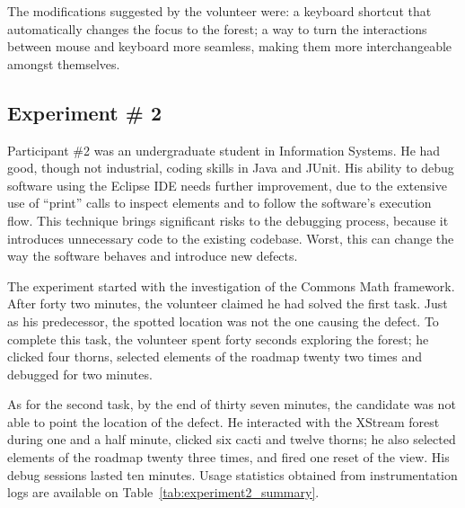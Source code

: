 The modifications suggested by the volunteer were: a keyboard shortcut that
automatically changes the focus to the forest; a way to turn the interactions
between mouse and keyboard more seamless, making them more interchangeable
amongst themselves.

\subsection{Experiment \# 2}

Participant \#2 was an undergraduate student in Information Systems. He had
good, though not industrial, coding skills in Java and JUnit. His ability
to debug software using the Eclipse IDE needs further improvement, due to the
extensive use of ``print'' calls to inspect elements and to follow the
software's execution flow. This technique brings significant risks to the
debugging process, because it introduces unnecessary code to the existing
codebase. Worst, this can change the way the software behaves and
introduce new defects.

The experiment started with the investigation of the Commons Math framework.
After forty two minutes, the volunteer claimed he had solved the first task.
Just as his predecessor, the spotted location was not the one causing the
defect. To complete this task, the volunteer spent forty seconds exploring the
forest; he clicked four thorns, selected elements of the roadmap twenty two
times and debugged for two minutes.

As for the second task, by the end of thirty seven minutes, the candidate was
not able to point the location of the defect. He interacted with the XStream
forest during one and a half minute, clicked six cacti and twelve thorns; he
also selected elements of the roadmap twenty three times, and fired one reset of
the view. His debug sessions lasted ten minutes. Usage statistics obtained from
instrumentation logs are available on Table~\ref{tab:experiment2_summary}.

